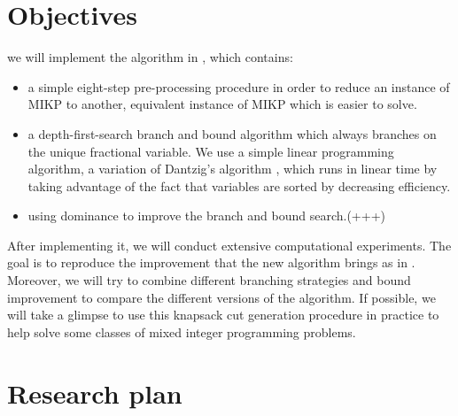 \documentclass[a4paper,10pt]{article}
\begin{document}
\section{Objectives}
we will implement the algorithm in \cite{fukasawa2011exact}, which contains:
\begin{itemize}
\item a simple eight-step pre-processing procedure in order to reduce an instance of MIKP to another, equivalent
instance of MIKP which is easier to solve.
\item a depth-first-search branch and bound algorithm which always branches on the unique fractional variable. We use a simple linear programming algorithm, a variation of Dantzig’s algorithm \cite{dantzig1957discrete}, which runs in linear time by taking advantage of the fact that variables are sorted by decreasing efficiency.
\item using dominance to improve the branch and bound search.(+++)
\end{itemize}
After implementing it, we will conduct extensive computational experiments. The goal is to reproduce the improvement that the new algorithm brings as in \cite{fukasawa2011exact}. Moreover, we will try to combine different branching strategies and bound improvement to compare the different versions of the algorithm. If possible, we will take a glimpse to use this knapsack cut generation procedure in practice to help solve some classes of mixed integer programming problems.


\section{Research plan}

 


 
\end{document}
